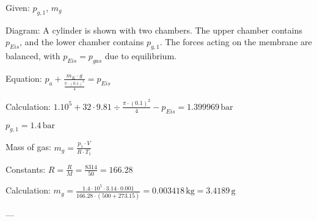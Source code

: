Given: \( p_{g,1} \), \( m_g \)  

Diagram: A cylinder is shown with two chambers. The upper chamber contains \( p_{Eis} \), and the lower chamber contains \( p_{g,1} \). The forces acting on the membrane are balanced, with \( p_{Eis} = p_{gas} \) due to equilibrium.  

Equation:  
\( p_{a} + \frac{m_K \cdot g}{\frac{\pi \cdot (0.1)^2}{4}} = p_{Eis} \)  

Calculation:  
\( 1.10^5 + 32 \cdot 9.81 \div \frac{\pi \cdot (0.1)^2}{4} - p_{Eis} = 1.399969 \, \text{bar} \)  

\( p_{g,1} = 1.4 \, \text{bar} \)  

Mass of gas:  
\( m_g = \frac{p_1 \cdot V}{R \cdot T_1} \)  

Constants:  
\( R = \frac{R}{M} = \frac{8314}{50} = 166.28 \)  

Calculation:  
\( m_g = \frac{1.4 \cdot 10^5 \cdot 3.14 \cdot 0.001}{166.28 \cdot (500 + 273.15)} = 0.003418 \, \text{kg} = 3.4189 \, \text{g} \)  

---